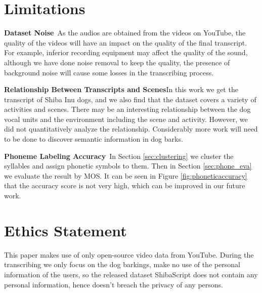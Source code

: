 \documentclass[11pt]{article}
\newcommand{\secref}[1]{Section \ref{#1}}
\newcommand{\figref}[1]{Figure \ref{#1}}
\begin{document}
\section*{Limitations}
\textbf{Dataset Noise}~\quad As the audios are obtained from the videos on YouTube, the quality of the videos will have an impact on the quality of the final transcript. For example, inferior recording equipment may affect the quality of the sound, although we have done noise removal to keep the quality, the presence of background noise will cause some losses in the transcribing process.

\noindent \textbf{Relationship Between Transcripts and Scenes}\quad In this work we get the transcript of Shiba Inu dogs, and we also find that the dataset covers a variety of activities and scenes. There may be an interesting relationship between the dog vocal units and the environment including the scene and activity. However, we did not quantitatively analyze 
 the relationship. Considerably more work will need to be done to discover semantic information in dog barks.

\noindent \textbf{Phoneme Labeling Accuracy}~\quad In \secref{sec:clustering} we cluster the syllables and assign phonetic symbols to them. Then in \secref{sec:phone_eva} we evaluate the result by MOS. It can be seen in \figref{fig:phoneticaccuracy} that the accuracy score is not very high, which can be improved in our future work.



\section*{Ethics Statement}
This paper makes use of only open-source video data from YouTube. During the transcribing we only focus on the dog barkings, make no use of the personal information of the users, so the released dataset ShibaScript does not contain any personal information, hence doesn’t breach the privacy of any persons. 
\end{document}

